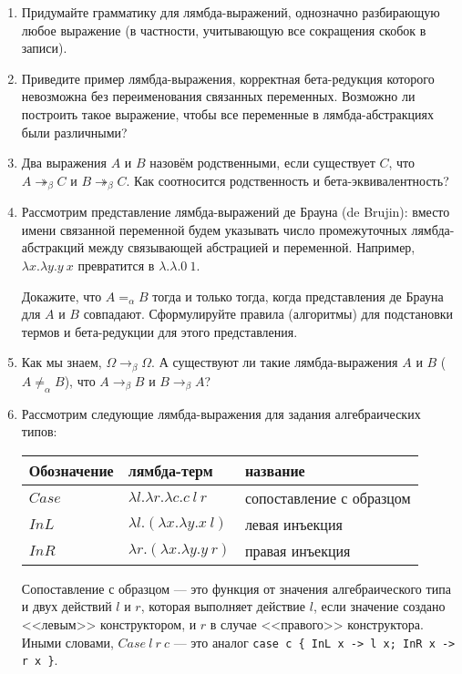 \documentclass[10pt,a4paper,oneside]{article}
\begin{document}
\begin{enumerate}
\item Придумайте грамматику для лямбда-выражений, однозначно разбирающую любое выражение
(в частности, учитывающую все сокращения скобок в записи).
\item Приведите пример лямбда-выражения, корректная бета-редукция которого невозможна без переименования
связанных переменных. Возможно ли построить такое выражение, чтобы все переменные в лямбда-абстракциях
были различными?
\item Два выражения $A$ и $B$ назовём родственными, если существует $C$, что
$A \twoheadrightarrow_\beta C$ и $B \twoheadrightarrow_\beta C$.
Как соотносится родственность и бета-эквивалентность? 

\item Рассмотрим представление лямбда-выражений де Брауна (de Brujin): вместо имени связанной переменной будем 
указывать число промежуточных лямбда-абстракций между связывающей абстрацией и переменной.
Например, $\lambda x.\lambda y.y\ x$ превратится в $\lambda.\lambda.0\ 1$.

Докажите, что $A =_\alpha B$ тогда и только тогда, когда представления де Брауна для $A$ и $B$ совпадают.
Сформулируйте правила (алгоритмы) для подстановки термов и бета-редукции для этого представления.

\item Как мы знаем, $\Omega \rightarrow_\beta \Omega$. А существуют ли такие лямбда-выражения
$A$ и $B$ ($A \ne_\alpha B$), что $A \rightarrow_\beta B$ и $B \rightarrow_\beta A$?

\item Рассмотрим следующие лямбда-выражения для задания алгебраических типов:

\begin{tabular}{lll}
Обозначение & лямбда-терм & название\\\hline
$Case$ & $\lambda l.\lambda r.\lambda c.c\ l\ r$ & сопоставление с образцом\\
$InL$ & $\lambda l.(\lambda x.\lambda y.x\ l)$ & левая инъекция\\
$InR$ & $\lambda r.(\lambda x.\lambda y.y\ r)$ & правая инъекция\\
\end{tabular}

Сопоставление с образцом --- это функция от значения алгебраического типа и двух действий $l$ и $r$, 
которая выполняет действие $l$, если значение создано <<левым>> конструктором, и $r$ в случае
<<правого>> конструктора. Иными словами, $Case\ l\ r\ c$ --- это аналог
\verb!case c { InL x -> l x; InR x -> r x }!.


\end{enumerate}
\end{document}
